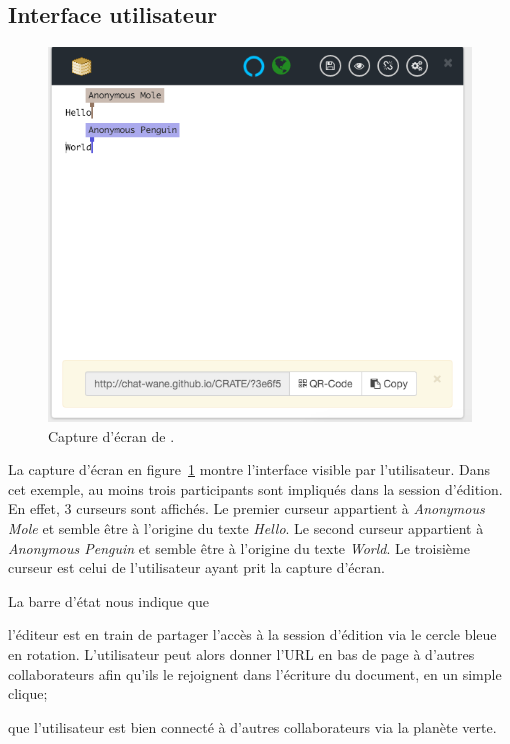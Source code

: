 \subsection{Interface utilisateur}

\begin{figure}
  \begin{center}
    \includegraphics[scale=0.6]{img/editor/cratescreenshot.png}
    \caption{\label{editor:img:screenshot}Capture d'écran de \CRATE.}
  \end{center}
\end{figure}

La capture d'écran en figure~\ref{editor:img:screenshot} montre l'interface
visible par l'utilisateur. Dans cet exemple, au moins trois participants sont
impliqués dans la session d'édition. En effet, 3 curseurs sont affichés. Le
premier curseur appartient à \emph{Anonymous Mole} et semble être à l'origine du
texte \emph{Hello}. Le second curseur appartient à \emph{Anonymous Penguin} et
semble être à l'origine du texte \emph{World}. Le troisième curseur est celui de
l'utilisateur ayant prit la capture d'écran.

La barre d'état nous indique que
\begin{inparaenum}[(i)]
\item l'éditeur est en train de partager l'accès à la session d'édition via le
  cercle bleue en rotation. L'utilisateur peut alors donner l'URL en bas de page
  à d'autres collaborateurs afin qu'ils le rejoignent dans l'écriture du
  document, en un simple clique;
\item que l'utilisateur est bien connecté à d'autres collaborateurs via la
  planète verte.
\end{inparaenum}

